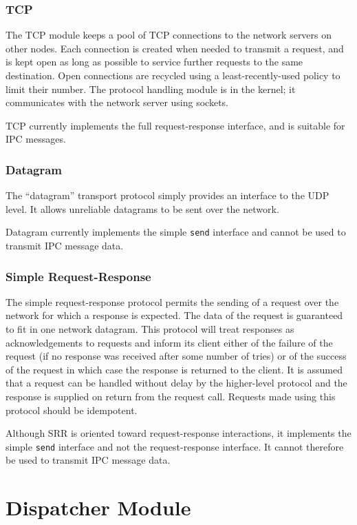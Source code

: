 \subsubsection{TCP}
The TCP module keeps a pool of TCP connections to the network servers
on other nodes. Each connection is created when needed to transmit a
request, and is kept open as long as possible to service further
requests to the same destination. Open connections are recycled using
a least-recently-used policy to limit their number. The protocol
handling module is in the kernel; it communicates with the network
server using sockets.

TCP currently implements the full request-response interface, and is suitable
for IPC messages. 

\subsubsection{Datagram}
The ``datagram'' transport protocol simply provides an interface to the UDP
level.  It allows unreliable datagrams to be sent over the network.

Datagram currently implements the simple \verb"send" interface and cannot be
used to transmit IPC message data.

\subsubsection{Simple Request-Response}
The simple request-response protocol permits the sending of a request over
the network for which a response is expected.  The data of the request is
guaranteed to fit in one network datagram.  This protocol will treat
responses as acknowledgements to requests and inform its client either of
the failure of the request (if no response was received after some number of
tries) or of the success of the request in which case the response is
returned to the client.  It is assumed that a request can be handled without
delay by the higher-level protocol and the response is supplied on return
from the request call. Requests made using this protocol should be idempotent.

Although SRR is oriented toward request-response interactions, it
implements the simple \verb"send" interface and not the
request-response interface. It cannot therefore be used to transmit
IPC message data.

\section{Dispatcher Module}
